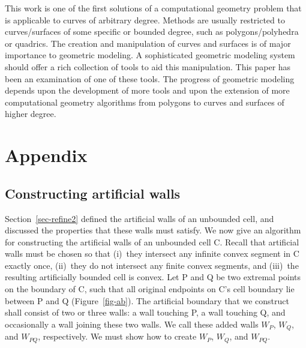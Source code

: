 This work is one of the first solutions
of a computational geometry problem that is applicable to curves of arbitrary degree.
Methods are usually restricted to curves/surfaces of some specific or 
bounded degree, such as polygons/polyhedra or quadrics.
The creation and manipulation of curves and surfaces is of major importance 
to geometric modeling.
A sophisticated geometric modeling system should offer 
a rich collection of tools to aid this manipulation.
This paper has been an examination of one of these tools.
The progress of geometric modeling depends upon the development of more tools and upon 
the extension of more computational geometry algorithms from polygons to curves and 
surfaces of higher degree.

\section{Appendix}
\label{sec-append}

\subsection{Constructing artificial walls}
\label{sec-caa}

Section~\ref{sec-refine2} defined the artificial walls of an unbounded cell,
and discussed the properties that these walls must satisfy.
We now give an algorithm for constructing the artificial walls of an unbounded
cell C.
Recall that artificial walls must be chosen so that 
(i)~they intersect any infinite convex segment in C exactly once,
(ii)~they do not intersect any finite convex segments, and
(iii)~the resulting artificially bounded cell is convex.
Let P and Q be two extremal points on the boundary of C, such that all original endpoints
on C's cell boundary lie between P and Q (Figure~\ref{fig-ab}).
The artificial boundary that we construct shall consist of two or three walls:
a wall touching P, a wall touching Q, and occasionally a wall joining these two walls.
We call these added walls $W_{P}$, $W_{Q}$, and $W_{PQ}$, respectively.
We must show how to create $W_{P}$, $W_{Q}$, and $W_{PQ}$.

